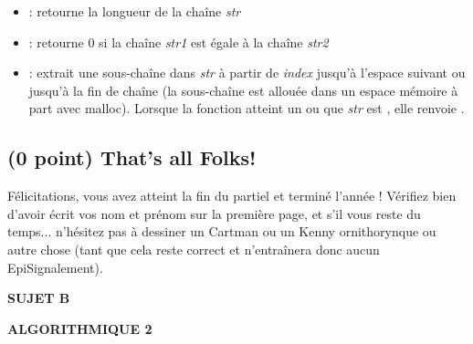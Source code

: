 \documentclass[11pt,a4paper]{article}
\newcommand{\TitreMatiere}{Algorithmique 2}
\begin{document}
\begin{itemize}
\item {} : retourne la longueur de la chaîne \textit{str}
\item {} : retourne 0 si la chaîne \textit{str1} est égale à la chaîne \textit{str2}
\item {} : extrait une sous-chaîne dans \textit{str} à partir de \textit{index} jusqu'à l'espace suivant ou jusqu'à la fin de chaîne (la sous-chaîne est allouée dans un espace mémoire à part avec malloc). Lorsque la fonction atteint un  ou que \textit{str} est , elle renvoie .
\end{itemize}


\begin{center}
\end{center}



\subsection{(0 point) That's all Folks!}

\noindent Félicitations, vous avez atteint la fin du partiel et terminé l'année !
Vérifiez bien d'avoir écrit vos nom et prénom sur la première page, et s'il vous reste du temps... n'hésitez pas à dessiner un Cartman ou un Kenny ornithorynque ou autre chose (tant que cela reste correct et n'entraînera donc aucun EpiSignalement).

\clearpage



\vfillFirst

\begin{center}

\begin{LARGE}
\textbf{SUJET B}

\bigskip

\textbf{\MakeUppercase{\TitreMatiere}}
\end{LARGE}

\end{center}

\vfillLast
\end{document}
